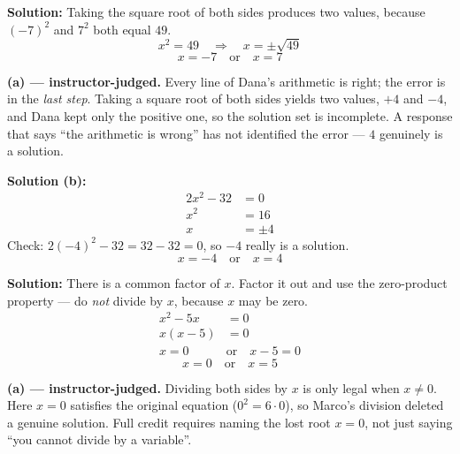 \documentclass[12pt]{article}
\begin{document}




\textbf{Solution:} Taking the square root of both sides produces two values, because $(-7)^2$ and $7^2$ both equal $49$.
\[ x^2 = 49 \quad \Longrightarrow \quad x = \pm\sqrt{49} \]
\[ \boxed{x = -7 \quad \text{or} \quad x = 7} \]


\textbf{(a) --- instructor-judged.} Every line of Dana's arithmetic is right; the error is in the \emph{last step}. Taking a square root of both sides yields two values, $+4$ and $-4$, and Dana kept only the positive one, so the solution set is incomplete. A response that says ``the arithmetic is wrong'' has not identified the error --- $4$ genuinely is a solution.

\textbf{Solution (b):}
\begin{align*}
  2x^2 - 32 &= 0 \\
  x^2 &= 16 \\
  x &= \pm 4
\end{align*}
Check: $2(-4)^2 - 32 = 32 - 32 = 0$, so $-4$ really is a solution.
\[ \boxed{x = -4 \quad \text{or} \quad x = 4} \]


\textbf{Solution:} There is a common factor of $x$. Factor it out and use the zero-product property --- do \emph{not} divide by $x$, because $x$ may be zero.
\begin{align*}
  x^2 - 5x &= 0 \\
  x(x-5) &= 0 \\
  x = 0 \quad &\text{or} \quad x - 5 = 0
\end{align*}
\[ \boxed{x = 0 \quad \text{or} \quad x = 5} \]


\textbf{(a) --- instructor-judged.} Dividing both sides by $x$ is only legal when $x \neq 0$. Here $x = 0$ satisfies the original equation ($0^2 = 6 \cdot 0$), so Marco's division deleted a genuine solution. Full credit requires naming the lost root $x = 0$, not just saying ``you cannot divide by a variable''.
\end{document}
